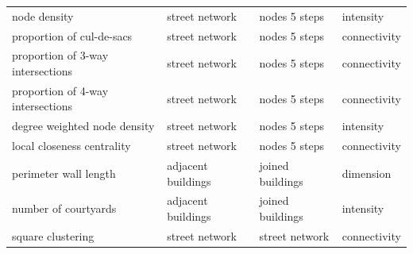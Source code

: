 \begin{longtable}{p{5cm}p{4cm}p{4cm}l}
                            node density &                  street network &              nodes 5 steps &    intensity \\
               proportion of cul-de-sacs &                  street network &              nodes 5 steps & connectivity \\
       proportion of 3-way intersections &                  street network &              nodes 5 steps & connectivity \\
       proportion of 4-way intersections &                  street network &              nodes 5 steps & connectivity \\
            degree weighted node density &                  street network &              nodes 5 steps &    intensity \\
              local closeness centrality &                  street network &              nodes 5 steps & connectivity \\
                   perimeter wall length &             adjacent buildings  &           joined buildings &    dimension \\
                    number of courtyards &             adjacent buildings  &           joined buildings &    intensity \\
                       square clustering &                  street network &             street network & connectivity \\
    \end{longtable}

